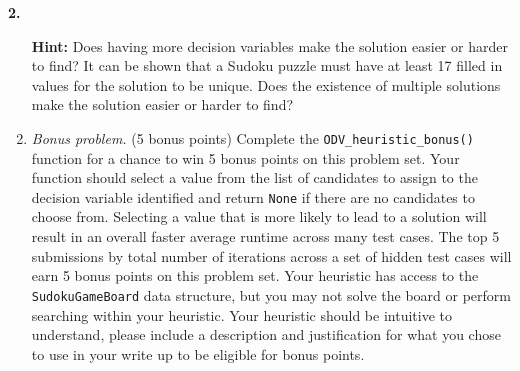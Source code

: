 \documentclass[12pt]{amsart}
\newenvironment{statement}[1]{\smallskip\noindent\color[rgb]{0.0,0.0,0.0} {\bf #1.}}{}
\theoremstyle{definition}
\theoremstyle{remark}
\newcommand{\1}{\mathds{1}}
\begin{document}
\begin{statement}{2}
\begin{enumerate}
    \noindent\textbf{Hint:} Does having more decision variables make the solution easier or harder to find? It can be shown that a Sudoku puzzle must have at least 17 filled in values for the solution to be unique. Does the existence of multiple solutions make the solution easier or harder to find?
    
    \vspace{1mm}
    
    \item \textit{Bonus problem.} (5 bonus points) Complete the \texttt{ODV\_heuristic\_bonus()} function for a chance to win 5 bonus points on this problem set. Your function should select a value from the list of candidates to assign to the decision variable identified and return \texttt{None} if there are no candidates to choose from. Selecting a value that is more likely to lead to a solution will result in an overall faster average runtime across many test cases. The top 5 submissions by total number of iterations across a set of hidden test cases will earn 5 bonus points on this problem set. Your heuristic has access to the \texttt{SudokuGameBoard} data structure, but you may not solve the board or perform searching within your heuristic. Your heuristic should be intuitive to understand, please include a description and justification for what you chose to use in your write up to be eligible for bonus points.  

\end{enumerate}
\end{statement}

\newpage
\end{document}
